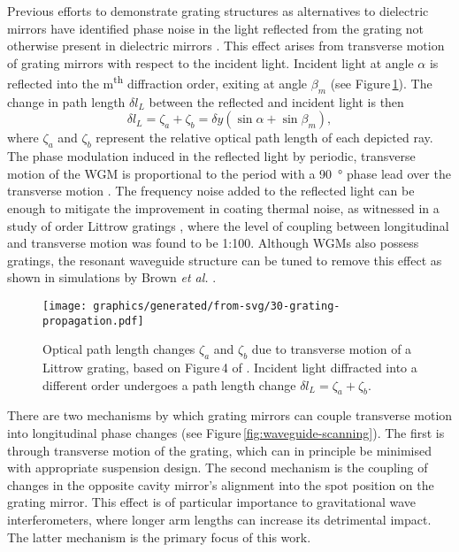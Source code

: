 Previous efforts to demonstrate grating structures as alternatives to dielectric mirrors have identified phase noise in the light reflected from the grating not otherwise present in dielectric mirrors \cite{Wise2005, Freise2007}. This effect arises from transverse motion of grating mirrors with respect to the incident light. Incident light at angle $\alpha$ is reflected into the m\textsuperscript{th} diffraction order, exiting at angle $\beta_m$ (see Figure\,\ref{fig:grating-propagation}). The change in path length $\delta l_L$ between the reflected and incident light is then
\begin{equation}
  \delta l_L = \zeta_a + \zeta_b = \delta y
  \left( \sin{\alpha} + \sin{\beta_m} \right),
\end{equation}
where $\zeta_a$ and $\zeta_b$ represent the relative optical path length of each depicted ray.
The phase modulation induced in the reflected light by periodic, transverse motion of the \gls{WGM} is proportional to the period with a \SI{90}{\degree} phase lead over the transverse motion \cite{Barr2011}. The frequency noise added to the reflected light can be enough to mitigate the improvement in coating thermal noise, as witnessed in a study of  order Littrow gratings \cite{Barr2011}, where the level of coupling between longitudinal and transverse motion was found to be 1:100. Although \glspl{WGM} also possess gratings, the resonant waveguide structure can be tuned to remove this effect as shown in simulations by Brown \emph{et al.} \cite{Brown2013}.

\begin{figure}
  \centering
  \texttt{[image: graphics/generated/from-svg/30-grating-propagation.pdf]}
  \caption[Optical path length changes $\zeta_a$ and $\zeta_b$ due to transverse motion of a Littrow grating]{\label{fig:grating-propagation}Optical path length changes $\zeta_a$ and $\zeta_b$ due to transverse motion of a Littrow grating, based on Figure\,4 of \cite{Freise2007}. Incident light diffracted into a different order undergoes a path length change $\delta l_L = \zeta_a + \zeta_b$.}
\end{figure}

There are two mechanisms by which grating mirrors can couple transverse motion into longitudinal phase changes (see Figure\,\ref{fig:waveguide-scanning}). The first is through transverse motion of the grating, which can in principle be minimised with appropriate suspension design. The second mechanism is the coupling of changes in the opposite cavity mirror's alignment into the spot position on the grating mirror. This effect is of particular importance to gravitational wave interferometers, where longer arm lengths can increase its detrimental impact. The latter mechanism is the primary focus of this work.

